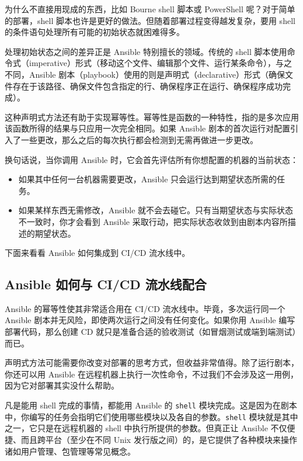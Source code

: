 \label{idx:939}
为什么不直接用现成的东西，比如 Bourne shell 脚本或 PowerShell 呢？对于简单的部署，shell 脚本也许是更好的做法。但随着部署过程变得越发复杂，要用 shell 的条件语句处理所有可能的初始状态就困难得多。

处理初始状态之间的差异正是 Ansible 特别擅长的领域。传统的 shell 脚本使用命令式（imperative）形式（移动这个文件、编辑那个文件、运行某条命令），与之不同，Ansible 剧本（playbook）使用的则是声明式（declarative）形式（确保文件存在于该路径、确保文件包含指定的行、确保程序正在运行、确保程序成功完成）。

这种声明式方法还有助于实现幂等性。幂等性是函数的一种特性，指的是多次应用该函数所得的结果与只应用一次完全相同。如果 Ansible 剧本的首次运行对配置引入了一些更改，那么之后的每次执行都会检测到无需再做进一步更改。

换句话说，当你调用 Ansible 时，它会首先评估所有你想配置的机器的当前状态：

\begin{itemize}
\item 如果其中任何一台机器需要更改，Ansible 只会运行达到期望状态所需的任务。
\item 如果某样东西无需修改，Ansible 就不会去碰它。只有当期望状态与实际状态不一致时，你才会看到 Ansible 采取行动，把实际状态收敛到由剧本内容所描述的期望状态。
\end{itemize}

下面来看看 Ansible 如何集成到 CI/CD 流水线中。

\subsection{Ansible 如何与 CI/CD 流水线配合}

\label{idx:940}
\label{idx:941}
\label{idx:942}
Ansible 的幂等性使其非常适合用在 CI/CD 流水线中。毕竟，多次运行同一个 Ansible 剧本并无风险，即使两次运行之间没有任何变化。如果你用 Ansible 编写部署代码，那么创建 CD 就只是准备合适的验收测试（如冒烟测试或端到端测试）而已。

声明式方法可能需要你改变对部署的思考方式，但收益非常值得。除了运行剧本，你还可以用 Ansible 在远程机器上执行一次性命令，不过我们不会涉及这一用例，因为它对部署其实没什么帮助。

凡是能用 shell 完成的事情，都能用 Ansible 的 \texttt{shell} 模块完成。这是因为在剧本中，你编写的任务会指明它们使用哪些模块以及各自的参数。\texttt{shell} 模块就是其中之一，它只是在远程机器的 shell 中执行所提供的参数。但真正让 Ansible 不仅便捷、而且跨平台（至少在不同 Unix 发行版之间）的，是它提供了各种模块来操作诸如用户管理、包管理等常见概念。

